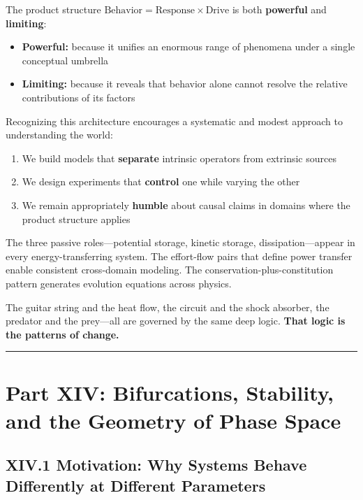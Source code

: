 \documentclass[
]{article}
\providecommand{\tightlist}{%
  \setlength{\itemsep}{0pt}\setlength{\parskip}{0pt}}
\begin{document}
The product structure
\(\text{Behavior} = \text{Response} \times \text{Drive}\) is both
\textbf{powerful} and \textbf{limiting}:

\begin{itemize}
\tightlist
\item
  \textbf{Powerful:} because it unifies an enormous range of phenomena
  under a single conceptual umbrella
\item
  \textbf{Limiting:} because it reveals that behavior alone cannot
  resolve the relative contributions of its factors
\end{itemize}

Recognizing this architecture encourages a systematic and modest
approach to understanding the world:

\begin{enumerate}
\def\labelenumi{\arabic{enumi}.}
\tightlist
\item
  We build models that \textbf{separate} intrinsic operators from
  extrinsic sources
\item
  We design experiments that \textbf{control} one while varying the
  other
\item
  We remain appropriately \textbf{humble} about causal claims in domains
  where the product structure applies
\end{enumerate}

The three passive roles---potential storage, kinetic storage,
dissipation---appear in every energy-transferring system. The
effort-flow pairs that define power transfer enable consistent
cross-domain modeling. The conservation-plus-constitution pattern
generates evolution equations across physics.

The guitar string and the heat flow, the circuit and the shock absorber,
the predator and the prey---all are governed by the same deep logic.
\textbf{That logic is the patterns of change.}

\begin{center}\rule{0.5\linewidth}{0.5pt}\end{center}

\newpage

\section{Part XIV: Bifurcations, Stability, and the Geometry of Phase
Space}\label{part-xiv-bifurcations-stability-and-the-geometry-of-phase-space}

\subsection{XIV.1 Motivation: Why Systems Behave Differently at
Different
Parameters}\label{xiv.1-motivation-why-systems-behave-differently-at-different-parameters}
\end{document}
